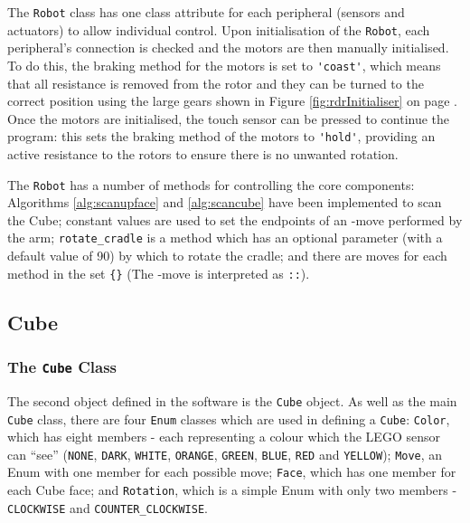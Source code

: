 \documentclass{report}
\newcommand{\moveset}[1]{\uppercase{\texttt{\{\formatmoves{#1}\}}}}
\newcommand{\movesequence}[1]{\uppercase{\texttt{:\formatmoves{#1}:}}}
\newcommand{\move}[1]{\uppercase{\texttt{\formatmovesnospace{#1}}}-move}
\newcommand{\lego}{LEGO }
\begin{document}
    The \lstinline|Robot| class has one class attribute for each peripheral (sensors and actuators) to allow individual control. Upon initialisation of the \lstinline|Robot|, each peripheral's connection is checked and the motors are then manually initialised. To do this, the braking method for the motors is set to \lstinline|'coast'|, which means that all resistance is removed from the rotor and they can be turned to the correct position using the large gears shown in Figure \ref{fig:rdrInitialiser} on page \pageref{fig:rdrInitialiser}. Once the motors are initialised, the touch sensor can be pressed to continue the program: this sets the braking method of the motors to \lstinline|'hold'|, providing an active resistance to the rotors to ensure there is no unwanted rotation.
    
    The \lstinline|Robot| has a number of methods for controlling the core components: Algorithms \ref{alg:scanupface} and \ref{alg:scancube} have been implemented to scan the Cube; constant values are used to set the endpoints of an \move{x} performed by the arm; \lstinline|rotate_cradle| is a method which has an optional parameter (with a default value of 90) by which to rotate the cradle; and there are moves for each method in the set \moveset{x.x'x2y.y'y2d.d'd"} (The \move{x'} is interpreted as \movesequence{x.x.x}).
    
    \subsection{Cube}
    
    \subsubsection{The \lstinline|Cube| Class}
    
    The second object defined in the software is the \lstinline|Cube| object.  As well as the main \lstinline|Cube| class, there are four \lstinline|Enum| classes which are used in defining a \lstinline|Cube|: \lstinline|Color|, which has eight members - each representing a colour which the \lego sensor can \enquote{see} (\lstinline|NONE|, \lstinline|DARK|, \lstinline|WHITE|, \lstinline|ORANGE|, \lstinline|GREEN|, \lstinline|BLUE|, \lstinline|RED| and \lstinline|YELLOW|); \lstinline|Move|, an Enum with one member for each possible move; \lstinline|Face|, which has one member for each Cube face; and \lstinline|Rotation|, which is a simple Enum with only two members - \lstinline|CLOCKWISE| and \lstinline|COUNTER_CLOCKWISE|.
    
\end{document}
